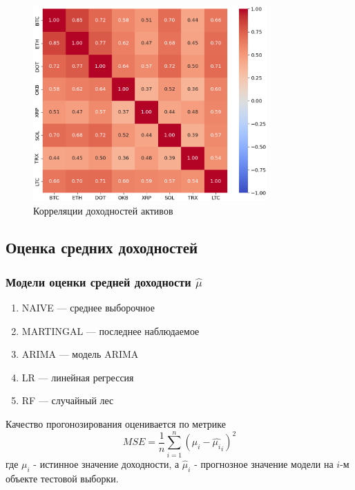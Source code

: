 \documentclass{beamer}
\begin{document}
\begin{frame}
    \frametitle{}
    \begin{figure}[H]
        \centering
        \includegraphics[width=0.8\textwidth]{corr_cut.png}
        \caption{Корреляции доходностей активов}
        \label{fig:corr}
    \end{figure}
\end{frame}

\subsection{Оценка средних доходностей}

\begin{frame}
    \frametitle{Модели оценки средней доходности $\hat{\mu}$}
    \begin{enumerate}
        \item NAIVE --- среднее выборочное
        \item MARTINGAL --- последнее наблюдаемое
        \item ARIMA --- модель ARIMA
        \item LR --- линейная регрессия
        \item RF --- случайный лес
    \end{enumerate}

    Качество прогонозирования оценивается по метрике 
    \[
	MSE = \frac{1}{n} \sum_{i=1}^{n} (\mu_i - \hat{\mu_i}_i)^2
    \]
    где $\mu_i$ - истинное значение доходности,
    а $\hat{\mu}_i$ - прогнозное значение модели на $i$-м объекте тестовой выборки.
\end{frame}
\end{document}
